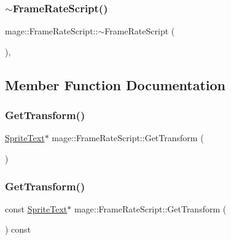 \subsubsection{\texorpdfstring{$\sim$\+Frame\+Rate\+Script()}{~FrameRateScript()}}
{\footnotesize\ttfamily mage\+::\+Frame\+Rate\+Script\+::$\sim$\+Frame\+Rate\+Script (\begin{DoxyParamCaption}{ }\end{DoxyParamCaption})\hspace{0.3cm}{\ttfamily [virtual]}, {\ttfamily [default]}}



\subsection{Member Function Documentation}
\hypertarget{classmage_1_1_frame_rate_script_a23f833cb5a8b78fb38a47ac0db2305a8}{}\label{classmage_1_1_frame_rate_script_a23f833cb5a8b78fb38a47ac0db2305a8} 
\subsubsection{\texorpdfstring{Get\+Transform()}{GetTransform()}\hspace{0.1cm}{\footnotesize\ttfamily [1/2]}}
{\footnotesize\ttfamily \hyperlink{classmage_1_1_sprite_text}{Sprite\+Text}$\ast$ mage\+::\+Frame\+Rate\+Script\+::\+Get\+Transform (\begin{DoxyParamCaption}{ }\end{DoxyParamCaption})}

\hypertarget{classmage_1_1_frame_rate_script_ab257acb42811f46fcb2aa90781dcdc28}{}\label{classmage_1_1_frame_rate_script_ab257acb42811f46fcb2aa90781dcdc28} 
\subsubsection{\texorpdfstring{Get\+Transform()}{GetTransform()}\hspace{0.1cm}{\footnotesize\ttfamily [2/2]}}
{\footnotesize\ttfamily const \hyperlink{classmage_1_1_sprite_text}{Sprite\+Text}$\ast$ mage\+::\+Frame\+Rate\+Script\+::\+Get\+Transform (\begin{DoxyParamCaption}{ }\end{DoxyParamCaption}) const}

